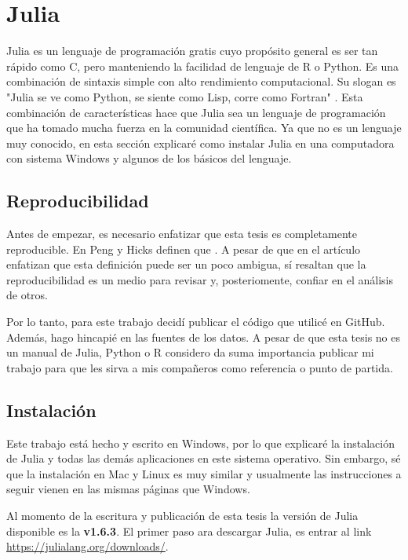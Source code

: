 \chapter{Julia}

Julia es un lenguaje de programación gratis cuyo propósito general es ser tan rápido como C, pero manteniendo la facilidad de lenguaje de R o Python. Es una combinación de sintaxis simple con alto rendimiento computacional. Su slogan es "Julia se ve como Python, se siente como Lisp, corre como Fortran" \citep{Hackers}. 
Esta combinación de características hace que Julia sea un lenguaje de programación que ha tomado mucha fuerza en la comunidad científica. Ya que no es un lenguaje muy conocido, en esta sección explicaré como instalar Julia en una computadora con sistema Windows y algunos de los básicos del lenguaje.

\section{Reproducibilidad}
Antes de empezar, es necesario enfatizar que esta tesis es completamente reproducible. En Peng y Hicks definen que  \cite{peng2021reproducible}. A pesar de que en el artículo enfatizan que esta definición puede ser un poco ambigua, sí resaltan que la reproducibilidad es un medio para revisar y, posteriomente, confiar en el análisis de otros. 

Por lo tanto, para este trabajo decidí publicar el código que utilicé en \textsf{GitHub}. Además, hago hincapié en las fuentes de los datos. A pesar de que esta tesis no es un manual de Julia, Python o R considero da suma importancia publicar mi trabajo para que les sirva a mis compañeros como referencia o punto de partida. 


\section{Instalación}
Este trabajo está hecho y escrito en Windows, por lo que explicaré la instalación de Julia y todas las demás aplicaciones en este sistema operativo. Sin embargo, sé que la instalación en Mac y Linux es muy similar y usualmente las instrucciones a seguir vienen en las mismas páginas que Windows. 

Al momento de la escritura y publicación de esta tesis la versión de Julia disponible es la \textbf{v1.6.3}. El primer paso ara descargar Julia, es entrar al link \url{https://julialang.org/downloads/}. 


